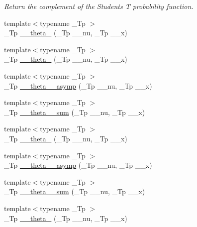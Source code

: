 \begin{DoxyCompactItemize}
\begin{DoxyCompactList}\small\item\em Return the complement of the Students T probability function. \end{DoxyCompactList}\item 
{\footnotesize template$<$typename \+\_\+\+Tp $>$ }\\\+\_\+\+Tp \hyperlink{namespacestd_1_1____detail_af7f54a82d2e5f0d8758cf53ebb2500e8}{\+\_\+\+\_\+theta\+\_} (\+\_\+\+Tp \+\_\+\+\_\+nu, \+\_\+\+Tp \+\_\+\+\_\+x)
\item 
{\footnotesize template$<$typename \+\_\+\+Tp $>$ }\\\+\_\+\+Tp \hyperlink{namespacestd_1_1____detail_ae783991fe49b94dff4ac9e3ebb446d4f}{\+\_\+\+\_\+theta\+\_} (\+\_\+\+Tp \+\_\+\+\_\+nu, \+\_\+\+Tp \+\_\+\+\_\+x)
\item 
{\footnotesize template$<$typename \+\_\+\+Tp $>$ }\\\+\_\+\+Tp \hyperlink{namespacestd_1_1____detail_ac7207ce23916e29df96b3b2159b55150}{\+\_\+\+\_\+theta\+\_\+\_\+asymp} (\+\_\+\+Tp \+\_\+\+\_\+nu, \+\_\+\+Tp \+\_\+\+\_\+x)
\item 
{\footnotesize template$<$typename \+\_\+\+Tp $>$ }\\\+\_\+\+Tp \hyperlink{namespacestd_1_1____detail_af434f6a07d92577f40f352aa3d44483c}{\+\_\+\+\_\+theta\+\_\+\_\+sum} (\+\_\+\+Tp \+\_\+\+\_\+nu, \+\_\+\+Tp \+\_\+\+\_\+x)
\item 
{\footnotesize template$<$typename \+\_\+\+Tp $>$ }\\\+\_\+\+Tp \hyperlink{namespacestd_1_1____detail_a6f965c639307555e5979b954a11ca0b8}{\+\_\+\+\_\+theta\+\_} (\+\_\+\+Tp \+\_\+\+\_\+nu, \+\_\+\+Tp \+\_\+\+\_\+x)
\item 
{\footnotesize template$<$typename \+\_\+\+Tp $>$ }\\\+\_\+\+Tp \hyperlink{namespacestd_1_1____detail_a975a9a52a8a483849dd0877c24ca5d74}{\+\_\+\+\_\+theta\+\_\+\_\+asymp} (\+\_\+\+Tp \+\_\+\+\_\+nu, \+\_\+\+Tp \+\_\+\+\_\+x)
\item 
{\footnotesize template$<$typename \+\_\+\+Tp $>$ }\\\+\_\+\+Tp \hyperlink{namespacestd_1_1____detail_a3dc1b5188464b81b6acbb2983ef0f77c}{\+\_\+\+\_\+theta\+\_\+\_\+sum} (\+\_\+\+Tp \+\_\+\+\_\+nu, \+\_\+\+Tp \+\_\+\+\_\+x)
\item 
{\footnotesize template$<$typename \+\_\+\+Tp $>$ }\\\+\_\+\+Tp \hyperlink{namespacestd_1_1____detail_a274d3801b84bcaad13c274c8bab32bcc}{\+\_\+\+\_\+theta\+\_} (\+\_\+\+Tp \+\_\+\+\_\+nu, \+\_\+\+Tp \+\_\+\+\_\+x)

\end{DoxyCompactItemize}
